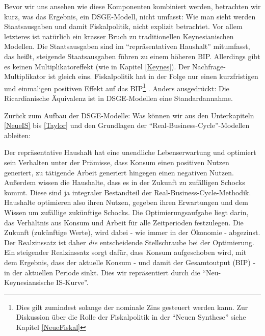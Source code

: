 Bevor wir uns ansehen wie diese Komponenten kombiniert werden, betrachten wir kurz, was das Ergebnis, ein DSGE-Modell, nicht umfasst: Wie man sieht werden Staatsausgaben und damit Fiskalpolitik, nicht explizit betrachtet. Vor allem letzteres ist natürlich ein krasser Bruch zu traditionellen Keynesianischen Modellen. Die Staatsausgaben sind im "`repräsentativen Haushalt"' mitumfasst, das heißt, steigende Staatsausgaben führen zu einem höheren BIP. Allerdings gibt es keinen Multiplikatoreffekt (wie in Kapitel \ref{Keynes}). Der Nachfrage-Multiplikator ist gleich eins. Fiskalpolitik hat in der Folge nur einen kurzfristigen und einmaligen positiven Effekt auf das BIP\footnote{Dies gilt zumindest solange der nominale Zins gesteuert werden kann. Zur Diskussion über die Rolle der Fiskalpolitik in der "`Neuen Synthese"' siehe Kapitel \ref{NeueFiskal}} \parencite{Woodford2011}. Anders ausgedrückt: Die Ricardianische Äquivalenz ist in DSGE-Modellen eine Standardannahme. 

Zurück zum Aufbau der DSGE-Modelle: Was können wir aus den Unterkapiteln \ref{NeueIS} bis \ref{Taylor} und den Grundlagen der "`Real-Business-Cycle"'-Modellen ableiten:

Der repräsentative Haushalt hat eine unendliche Lebenserwartung und optimiert sein Verhalten unter der Prämisse, dass Konsum einen positiven Nutzen generiert, zu tätigende Arbeit generiert hingegen einen negativen Nutzen. Außerdem wissen die Haushalte, dass es in der Zukunft zu zufälligen Schocks kommt. Diese sind ja integraler Bestandteil der Real-Business-Cycle-Methodik. Haushalte optimieren also ihren Nutzen, gegeben ihren Erwartungen und dem Wissen um zufällige zukünftige Schocks. Die Optimierungsaufgabe liegt darin, das Verhältnis aus Konsum und Arbeit für alle Zeitperioden festzulegen. Die Zukunft (zukünftige Werte), wird dabei - wie immer in der Ökonomie - abgezinst. Der Realzinssatz ist daher \textit{die} entscheidende Stellschraube bei der Optimierung. Ein steigender Realzinssatz sorgt dafür, dass Konsum aufgeschoben wird, mit dem Ergebnis, dass der aktuelle Konsum - und damit der Gesamtoutput (BIP) - in der aktuellen Periode sinkt. Dies wir repräsentiert durch die "`Neu-Keynesiansische IS-Kurve"'.

